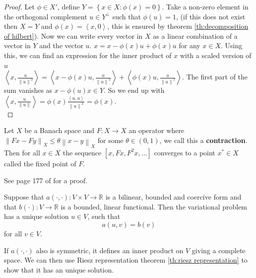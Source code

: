 \documentclass[../Main/main.tex]{subfiles}
\begin{document}
	\begin{proof}
		Let $\phi \in X'$, define $Y = \left \{ x\in X:\phi (x)=0 \right \}$. Take a non-zero element in the orthogonal complement $u\in Y^{\bot}$ such that $\phi (u)=1$, (if this does not exist then $X=Y$ and $\phi (x) = \left \langle x, 0\right \rangle$, this is ensured by theorem \ref{th:decomposition of hilbert}). Now we can write every vector in $X$ as a linear combination of a vector in $Y$ and the vector $u$. $x = x-\phi (x) u + \phi(x) u$ for any $x \in X$. Using this, we can find an expression for the inner product of $x$ with a scaled version of $u$ \\
		$\left \langle x,\frac{u}{\left \| u \right \|^2} \right \rangle  = \left \langle x-\phi (x)u,\frac{u}{\left \| u \right \|^2} \right \rangle + \left \langle \phi (x)u,\frac{u}{\left \| u \right \|^2} \right \rangle $.
		The first part of the sum vanishes as $x - \phi (u)x \in Y$. So we end up with \\
		$\left \langle x,\frac{u}{\left \| u \right \|} \right \rangle  = \phi (x)\frac{\left \langle u,u\right \rangle}{\left \| u \right \|^2} = \phi (x).$ \\
	\end{proof}
	\begin{theorem}\label{th:Banach}
		Let $X$ be a Banach space and $F:X\rightarrow X$ an operator where $\left \|Fx-Fy\right \|_X\leq \theta \left \| x-y \right\|_X$ for some $\theta \in (0,1)$, we call this a \textbf{contraction}.\\
		Then for all $x \in X$ the sequence $[x,Fx,F^2x,...]$ converges to a point $x^* \in X$ called the fixed point of $F$.
	\end{theorem}
	See page 177 of \cite{Cheney} for a proof.
	\begin{theorem}\label{th:lax milgram}
		Suppose that $a(\cdot,\cdot):V \times V \rightarrow \mathbb{R}$ is a bilinear, bounded and coercive form and that $b(\cdot): V \rightarrow \mathbb{R}$ is a bounded, linear functional. Then the variational problem has a unique solution $u\in V$, such that
		\begin{equation}\label{eq:lax milgram}
			a(u,v)=b(v)
		\end{equation}
		for all $v \in V$.
	\end{theorem}
	\begin{remark}
		If $a(\cdot,\cdot)$ also is symmetric, it defines an inner product on $V$ giving a complete space. We can then use Riesz representation theorem \ref{th:riesz representation} to show that it has an unique solution.
	\end{remark}
\end{document}
